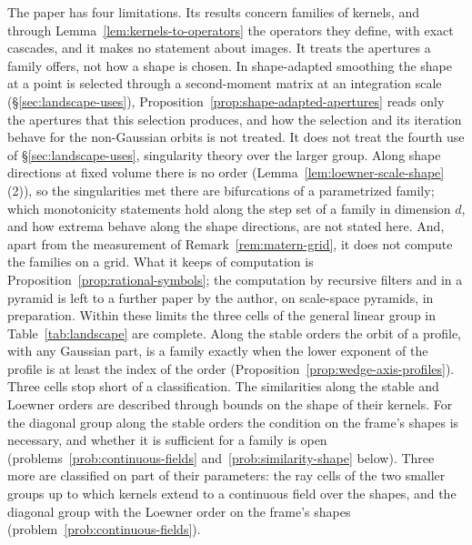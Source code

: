 The paper has four limitations. Its results concern families of kernels, and through
Lemma~\ref{lem:kernels-to-operators} the operators they define, with exact cascades, and it makes no
statement about images. It treats the apertures a family offers, not how a shape is chosen. In
shape-adapted smoothing the shape at a point is selected through a second-moment matrix at an
integration scale (\S\ref{sec:landscape-uses}), Proposition~\ref{prop:shape-adapted-apertures} reads
only the apertures that this selection produces, and how the selection and its iteration behave for
the non-Gaussian orbits is not treated. It does not treat the fourth use of
\S\ref{sec:landscape-uses}, singularity theory over the larger group. Along shape directions at
fixed volume there is no order (Lemma~\ref{lem:loewner-scale-shape}(2)), so the singularities met
there are bifurcations of a parametrized family; which monotonicity statements hold along the step
set of a family in dimension $d$, and how extrema behave along the shape directions, are not stated
here. And, apart from the measurement of Remark~\ref{rem:matern-grid}, it does not compute the families
on a grid. What it keeps of computation is
Proposition~\ref{prop:rational-symbols}; the computation by recursive filters and in a pyramid is
left to a further paper by the author, on scale-space pyramids, in preparation.
Within these limits the three cells of the general linear group in Table~\ref{tab:landscape} are
complete. Along the stable orders the orbit of a profile, with any Gaussian part, is a
family exactly when the lower exponent of the profile is at least the index of the order
(Proposition~\ref{prop:wedge-axis-profiles}). Three cells stop short of a classification. The
similarities along the stable and Loewner orders are described through bounds on the shape of their
kernels. For the diagonal group along the stable orders the condition on the frame's shapes is
necessary, and whether it is sufficient for a family is open (problems~\ref{prob:continuous-fields}
and~\ref{prob:similarity-shape} below). Three more are classified on part of their parameters: the ray
cells of the two smaller groups up to which kernels extend to a continuous field over the shapes, and
the diagonal group with the Loewner order on the frame's shapes (problem~\ref{prob:continuous-fields}).

